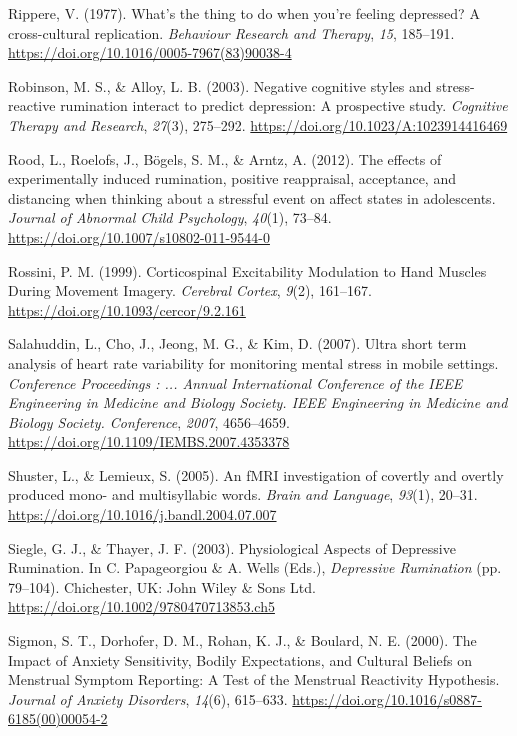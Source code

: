 \documentclass[a4paper,12pt,twoside,openright,oldfontcommands]{memoir}
\begin{document}
\hypertarget{ref-Rippere1977}{}
Rippere, V. (1977). What's the thing to do when you're feeling
depressed? A cross-cultural replication. \emph{Behaviour Research and
Therapy}, \emph{15}, 185--191.
\url{https://doi.org/10.1016/0005-7967(83)90038-4}

\hypertarget{ref-Robinson2003}{}
Robinson, M. S., \& Alloy, L. B. (2003). Negative cognitive styles and
stress-reactive rumination interact to predict depression: A prospective
study. \emph{Cognitive Therapy and Research}, \emph{27}(3), 275--292.
\url{https://doi.org/10.1023/A:1023914416469}

\hypertarget{ref-Rood2012}{}
Rood, L., Roelofs, J., Bögels, S. M., \& Arntz, A. (2012). The effects
of experimentally induced rumination, positive reappraisal, acceptance,
and distancing when thinking about a stressful event on affect states in
adolescents. \emph{Journal of Abnormal Child Psychology}, \emph{40}(1),
73--84. \url{https://doi.org/10.1007/s10802-011-9544-0}

\hypertarget{ref-rossini_corticospinal_1999}{}
Rossini, P. M. (1999). Corticospinal Excitability Modulation to Hand
Muscles During Movement Imagery. \emph{Cerebral Cortex}, \emph{9}(2),
161--167. \url{https://doi.org/10.1093/cercor/9.2.161}

\hypertarget{ref-Salahuddin2007}{}
Salahuddin, L., Cho, J., Jeong, M. G., \& Kim, D. (2007). Ultra short
term analysis of heart rate variability for monitoring mental stress in
mobile settings. \emph{Conference Proceedings : ... Annual International
Conference of the IEEE Engineering in Medicine and Biology Society. IEEE
Engineering in Medicine and Biology Society. Conference}, \emph{2007},
4656--4659. \url{https://doi.org/10.1109/IEMBS.2007.4353378}

\hypertarget{ref-shuster_fmri_2005}{}
Shuster, L., \& Lemieux, S. (2005). An fMRI investigation of covertly
and overtly produced mono- and multisyllabic words. \emph{Brain and
Language}, \emph{93}(1), 20--31.
\url{https://doi.org/10.1016/j.bandl.2004.07.007}

\hypertarget{ref-papageorgiou_physiological_2003}{}
Siegle, G. J., \& Thayer, J. F. (2003). Physiological Aspects of
Depressive Rumination. In C. Papageorgiou \& A. Wells (Eds.),
\emph{Depressive Rumination} (pp. 79--104). Chichester, UK: John Wiley
\& Sons Ltd. \url{https://doi.org/10.1002/9780470713853.ch5}

\hypertarget{ref-sigmon_impact_2000}{}
Sigmon, S. T., Dorhofer, D. M., Rohan, K. J., \& Boulard, N. E. (2000).
The Impact of Anxiety Sensitivity, Bodily Expectations, and Cultural
Beliefs on Menstrual Symptom Reporting: A Test of the Menstrual
Reactivity Hypothesis. \emph{Journal of Anxiety Disorders},
\emph{14}(6), 615--633.
\url{https://doi.org/10.1016/s0887-6185(00)00054-2}
\end{document}
